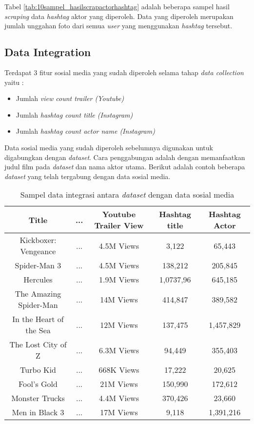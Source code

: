Tabel \ref{tab:10sampel_hasilscrapactorhashtag} adalah beberapa sampel hasil \textit{scraping} data \textit{hashtag} aktor yang diperoleh. Data yang diperoleh merupakan jumlah unggahan foto dari semua \textit{user} yang menggunakan \textit{hashtag} tersebut. 

\subsection{Data Integration}
Terdapat 3 fitur sosial media yang sudah diperoleh selama tahap \textit{data collection} yaitu : 

\begin{itemize}
\item Jumlah \textit{view count trailer (Youtube)}
\item Jumlah \textit{hashtag count title (Instagram)}  
\item Jumlah \textit{hashtag count actor name (Instagram)}
\end{itemize}

Data sosial media yang sudah diperoleh sebelumnya digunakan untuk digabungkan dengan \textit{dataset}. Cara penggabungan adalah dengan memanfaatkan judul film pada \textit{dataset} dan nama aktor utama. Berikut adalah contoh beberapa \textit{dataset} yang telah tergabung dengan data sosial media. 

\begin{table}[H]
\caption{Sampel data integrasi antara \textit{dataset} dengan data sosial media}
\centering
\begin{tabular}{|c|c|c|c|c|}
\hline 
Title & ... & Youtube Trailer View & Hashtag title & Hashtag Actor \\ 
\hline 
Kickboxer: Vengeance & ... & 4.5M Views & 3,122 & 65,443 \\ 
\hline 
Spider-Man 3 & ... & 4.5M Views & 138,212 & 205,845 \\ 
\hline 
Hercules & ... & 1.9M Views & 1,0737,96 & 645,185 \\ 
\hline 
The Amazing Spider-Man & ... & 14M Views & 414,847 & 389,582 \\ 
\hline 
In the Heart of the Sea & ... & 12M Views & 137,475 & 1,457,829 \\ 
\hline 
The Lost City of Z & ... & 6.3M Views & 94,449 & 355,403 \\ 
\hline 
Turbo Kid & ... & 668K Views & 17,222 & 20,625 \\ 
\hline 
Fool's Gold & ... & 21M Views & 150,990 & 172,612 \\ 
\hline 
Monster Trucks & ... & 4.4M Views & 370,426 & 23,660 \\ 
\hline 
Men in Black 3 & ... & 17M Views & 9,118 & 1,391,216 \\ 
\hline 
\end{tabular} 
\label{tab:10sampel_dataintegrasiiterasi3}
\end{table}


